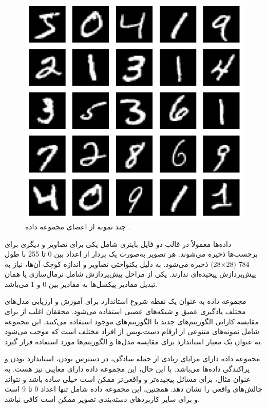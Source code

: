 \begin{figure}[b!]
	\centering
	\includegraphics[scale=0.5]{images/chap5/mnist.png}%
	\caption{%
		چند نمونه از اعضای مجموعه داده
		\cite{holzer2023dynamically}.
	}
	\label{mnist}
	\centering
\end{figure}


داده‌ها معمولاً در قالب دو فایل باینری شامل یکی برای تصاویر و دیگری برای برچسب‌ها ذخیره می‌شوند. هر تصویر به‌صورت یک بردار از اعداد بین 0 تا 255 با طول 784
(28$\times$28)
ذخیره می‌شود. به دلیل یکنواختی تصاویر و اندازه کوچک آن‌ها، نیاز به پیش‌پردازش پیچیده‌ای ندارند. یکی از مراحل پیش‌پردازش شامل نرمال‌سازی یا همان تبدیل مقادیر پیکسل‌ها به مقادیر بین 0 و 1 می‌باشد.

مجموعه داده
به عنوان یک نقطه شروع استاندارد برای آموزش و ارزیابی مدل‌های مختلف یادگیری عمیق و شبکه‌های عصبی استفاده می‌شود. محققان اغلب از
برای مقایسه کارایی الگوریتم‌های جدید با الگوریتم‌های موجود استفاده می‌کنند. این مجموعه شامل نمونه‌های متنوعی از ارقام دست‌نویس از افراد مختلف است که موجب می‌شود به عنوان یک معیار استاندارد برای مقایسه مدل‌ها و الگوریتم‌ها مورد استفاده قرار گیرد.

مجموعه داده
دارای مزایای زیادی از جمله سادگی، در دسترس بودن، استاندارد بودن و پراکندگی داده‌ها می‌باشد. با این حال، این مجموعه داده دارای معایبی نیز هست. به عنوان مثال، برای مسائل پیچیده‌تر و واقعی‌تر ممکن است
خیلی ساده باشد و نتواند چالش‌های واقعی را نشان دهد. همچنین، این مجموعه داده شامل تنها اعداد 0 تا 9 است و برای سایر کاربردهای دسته‌بندی تصویر ممکن است کافی نباشد.

